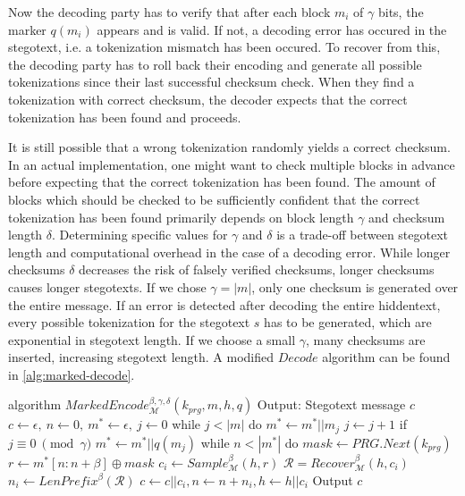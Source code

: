 Now the decoding party has to verify that after each block $m_i$ of $\gamma$ bits, the marker $q(m_i)$ appears and is valid.
If not, a decoding error has occured in the stegotext, i.e. a tokenization mismatch has been occured.
To recover from this, the decoding party has to roll back their encoding and generate all possible tokenizations since their last successful checksum check.
When they find a tokenization with correct checksum, the decoder expects that the correct tokenization has been found and proceeds.

It is still possible that a wrong tokenization randomly yields a correct checksum.
In an actual implementation, one might want to check multiple blocks in advance before expecting that the correct tokenization has been found.
The amount of blocks which should be checked to be sufficiently confident that the correct tokenization has been found primarily depends on block length $\gamma$ and checksum length $\delta$.
Determining specific values for $\gamma$ and $\delta$ is a trade-off between stegotext length and computational overhead in the case of a decoding error.
While longer checksums $\delta$ decreases the risk of falsely verified checksums, longer checksums causes longer stegotexts.
If we chose $\gamma = |m|$, only one checksum is generated over the entire message. If an error is detected after decoding the entire hiddentext, every possible tokenization for the stegotext $s$ has to be generated, which are exponential in stegotext length.
If we choose a small $\gamma$, many checksums are inserted, increasing stegotext length.
A modified $Decode$ algorithm can be found in \autoref{alg:marked-decode}.

\begin{Pseudocode}[caption={
Marked Encode Algorithm.
The modification this algorithm introduces is that after every $\gamma$ bits a checksum $q(m_i)$ is inserted into the hiddentext.
This allows the recipient to check for decoding errors due to wrong tokenization.
$q$ is a function $q \colon \{0,1\}^\gamma \rightarrow \{0,1\}^\delta$ which generates a checksum of length $\delta$ for a message block of length $\gamma$.
}, label={alg:marked-encode}]
algorithm $MarkedEncode_{\mathcal{M}}^{\beta, \gamma, \delta}(k_{prg}, m, h, q)$
	Output: Stegotext message $c$
	$c \leftarrow \epsilon,~ n \leftarrow 0,~ m^* \leftarrow \epsilon,~ j \leftarrow 0$
	while $j < |m|$ do
		$m^* \leftarrow m^* || m_j$
		$j \leftarrow j + 1$
		if $j \equiv 0~ \pmod \gamma$
			$m^* \leftarrow m^* || q(m_j)$
	while $n < |m^*|$ do
		$mask \leftarrow PRG.Next(k_{prg})$
		$r \leftarrow m^*[n:n+\beta] \oplus mask$
		$c_i \leftarrow Sample_{\mathcal{M}}^\beta(h, r)$
		$\mathcal{R} = Recover_{\mathcal{M}}^\beta(h, c_i)$
		$n_i \leftarrow LenPrefix^\beta(\mathcal{R})$
		$c \leftarrow c || c_i, n \leftarrow n+n_i, h \leftarrow h||c_i$
	Output $c$
\end{Pseudocode}



